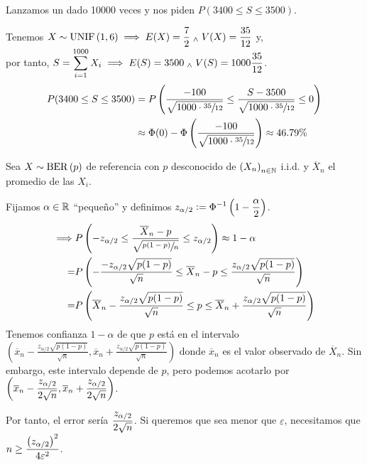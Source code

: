 \begin{ejem}
	Lanzamos un dado 10000 veces y nos piden $P(3400 \leq S \leq 3500)$.

	Tenemos $\displaystyle X\sim \operatorname{UNIF}\left(1,6\right) \implies E(X) = \frac{7}{2} \; _{\wedge} \; V(X) = \frac{35}{12}$ y,\\
	por tanto, $\displaystyle S = \sum_{i=1}^{1000} X_i \implies E(S) = 3500 \; _{\wedge} \; V(S) = 1000\frac{35}{12}$.
	\[\begin{aligned}
			P(3400 \leq S \leq 3500) & = P\left(\frac{-100}{\sqrt{1000 \cdot \sfrac{35}{12}}} \leq \frac{S-3500}{\sqrt{1000\cdot \sfrac{35}{12}}} \leq 0\right) \\
			                         & \approx \Phi(0) - \Phi\left(\frac{-100}{\sqrt{1000\cdot \sfrac{35}{12}}}\right) \approx 46.79\%
		\end{aligned}\]
\end{ejem}

\begin{ejem}
	Sea $X\sim \operatorname{BER}\left(p\right)$ de referencia con $p$ desconocido de $\left(X_n\right)_{n\in\mathbb{N}}$ i.i.d. y $\overline{X}_n$ el promedio de las $X_i$.

	Fijamos $\alpha \in \mathbb{R}$ ``pequeño'' y definimos $\displaystyle z_{\alpha/2} \vcentcolon= \Phi^{-1}\left(1-\frac{\alpha}{2}\right)$.
	\[\begin{aligned}
			\implies & P\left(-z_{\alpha/2} \leq \frac{\overline{X}_n - p}{\sqrt{\sfrac{p(1-p)}{n}}} \leq z_{\alpha/2}\right) \approx 1-\alpha                           \\
			=        & P\left(-\frac{-z_{\alpha/2}\sqrt{p(1-p)}}{\sqrt{n}} \leq \overline{X}_n - p \leq \frac{z_{\alpha/2}\sqrt{p(1-p)}}{\sqrt{n}}\right)                \\
			=        & P\left(\overline{X}_n - \frac{z_{\alpha/2}\sqrt{p(1-p)}}{\sqrt{n}} \leq p \leq \overline{X}_n + \frac{z_{\alpha/2}\sqrt{p(1-p)}}{\sqrt{n}}\right)
		\end{aligned}\]
	Tenemos confianza $1-\alpha$ de que $p$ está en el intervalo $\left(\overline{x}_n - \frac{z_{\alpha/2}\sqrt{p(1-p)}}{\sqrt{n}}, \overline{x}_n + \frac{z_{\alpha/2}\sqrt{p(1-p)}}{\sqrt{n}}\right)$ donde $\overline{x}_n$ es el valor observado de $\overline{X}_n$. Sin embargo, este intervalo depende de $p$, pero podemos acotarlo por $\displaystyle \left(\overline{x}_n - \frac{z_{\alpha/2}}{2\sqrt{n}}, \overline{x}_n + \frac{z_{\alpha/2}}{2\sqrt{n}}\right)$.

	Por tanto, el error sería $\displaystyle \frac{z_{\alpha/2}}{2\sqrt{n}}$. Si queremos que sea menor que $\varepsilon$, necesitamos que $\displaystyle n \geq \frac{\left(z_{\alpha/2}\right)^2}{4\varepsilon^2}$.
\end{ejem}

